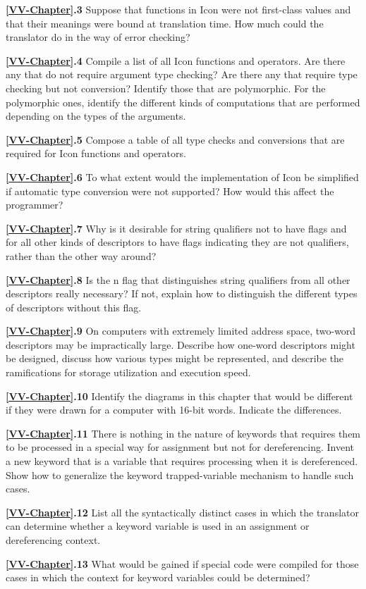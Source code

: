 \noindent\textbf{\ref*{VV-Chapter}.3}
Suppose that functions in Icon were not
first-class values and that their meanings were bound at translation
time. How much could the translator do in the way of error checking?

\noindent\textbf{\ref*{VV-Chapter}.4}
Compile a list of all Icon functions and
operators. Are there any that do not require argument type checking?
Are there any that require type checking but not conversion? Identify
those that are polymorphic. For the polymorphic ones, identify the
different kinds of computations that are performed depending on the
types of the arguments.

\noindent\textbf{\ref*{VV-Chapter}.5}
Compose a table of all type checks and
conversions that are required for Icon functions and operators.

\noindent\textbf{\ref*{VV-Chapter}.6}
To what extent would the implementation of Icon
be simplified if automatic type conversion were not supported? How
would this affect the programmer?

\noindent\textbf{\ref*{VV-Chapter}.7}
Why is it desirable for string qualifiers not to have
flags and for all other kinds of descriptors to have flags indicating they
are not qualifiers, rather than the other way around?

\noindent\textbf{\ref*{VV-Chapter}.8}
Is the n flag that distinguishes string qualifiers
from all other descriptors really necessary? If not, explain how to
distinguish the different types of descriptors without this flag.

\noindent\textbf{\ref*{VV-Chapter}.9}
On computers with extremely limited address
space, two-word descriptors may be impractically large. Describe how
one-word descriptors might be designed, discuss how various types
might be represented, and describe the ramifications for storage
utilization and execution speed.

\noindent\textbf{\ref*{VV-Chapter}.10}
Identify the diagrams in this chapter that
would be different if they were drawn for a computer with 16-bit
words.  Indicate the differences.

\noindent\textbf{\ref*{VV-Chapter}.11}
There is nothing in the nature of keywords that
requires them to be processed in a special way for assignment but not
for dereferencing. Invent a new keyword that is a variable that
requires processing when it is dereferenced. Show how to generalize
the keyword trapped-variable mechanism to handle such cases.

\noindent\textbf{\ref*{VV-Chapter}.12}
List all the syntactically distinct cases in which the
translator can determine whether a keyword variable is used in an
assignment or dereferencing context.

\noindent\textbf{\ref*{VV-Chapter}.13}
What would be gained if special code were compiled for
those cases in which the context for keyword variables could be determined?
